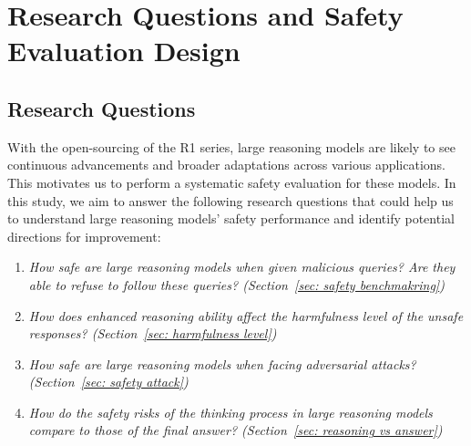 \section{Research Questions and  Safety Evaluation Design}

\subsection{Research Questions}
With the open-sourcing of the R1 series, large reasoning models are likely to see continuous advancements and broader adaptations across various applications. 
This motivates us to perform a systematic safety evaluation for these models.
In this study, we aim to answer the following research questions that could help us to understand large reasoning models' safety performance and identify potential directions for improvement: 
\begin{enumerate}[leftmargin=*, itemsep=0pt]
    \item \textit{How safe are large reasoning models when given malicious queries? Are they able to refuse to follow these queries? (Section~\ref{sec: safety benchmakring})}
    \item \textit{How does enhanced reasoning ability affect the harmfulness level of the unsafe responses?
    (Section~\ref{sec: harmfulness level})
    }
    \item \textit{How safe are large reasoning models when facing adversarial attacks? (Section~\ref{sec: safety attack})}
    \item \textit{How do the safety risks of the thinking process in large reasoning models compare to those of the final answer? (Section~\ref{sec: reasoning vs answer})}
\end{enumerate}

